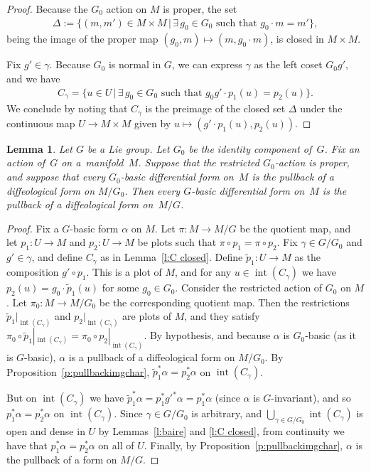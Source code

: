 \documentclass[pdftex]{sigma}
\numberwithin{equation}{section}
\newtheorem{Lemma}[Theorem]{Lemma}
\newcommand{\inter}{{\operatorname{int}}} %
\newcommand{\hypref}[2]{{#2~\ref{#1}}}
\begin{document}
\begin{proof}
Because the $G_0$ action on $M$ is proper, the set
\begin{gather*}
\Delta := \{ (m,m') \in M \times M \, | \,
\exists\, g_0 \in G_0 \text{ such that } g_0 \cdot m = m' \},
\end{gather*}
being the image of the proper map $(g_0,m) \mapsto (m,g_0 \cdot m)$,
is closed in $M \times M$.

Fix $g' \in \gamma$. Because $G_0$ is normal in $G$,
we can express $\gamma$ as the left coset $G_0 g'$, and we have
\begin{gather*} C_\gamma = \{ u \in U \, | \, \exists\, g_0 \in G_0 \text{ such that }
g_0 g' \cdot p_1(u) = p_2(u) \} .\end{gather*}
We conclude by noting that $C_\gamma$ is the preimage of the closed set $\Delta$
under the continuous map $U \to M \times M$
given by $u \mapsto ( g' \cdot p_1(u) , p_2(u) )$.
\end{proof}

\begin{Lemma} \label{l:conntodisc}
Let $G$ be a Lie group. Let $G_0$ be the identity component of~$G$.
Fix an action of~$G$ on a~mani\-fold~$M$.
Suppose that the restricted $G_0$-action is proper,
and suppose that every $G_0$-basic differential form on~$M$
is the pullback of a diffeological form on $M/G_0$.
Then every $G$-basic differential form on~$M$
is the pullback of a diffeological form on~$M/G$.
\end{Lemma}

\begin{proof}
Fix a $G$-basic form $\alpha$ on $M$.
Let $\pi \colon M\to M/G$ be the quotient map,
and let $p_1 \colon U\to M$ and $p_2 \colon U\to M$ be plots
such that $\pi\circ p_1=\pi\circ p_2$.
Fix $\gamma\in G/G_0$ and
$g' \in \gamma$, and def\/ine $C_\gamma$
as in \hypref{l:C closed}{Lemma}. Def\/ine $\tilde{p}_1 \colon U \to M$
as the composition
$g' \circ p_1$. This is a plot of $M$,
and for any $u \in \inter(C_\gamma)$ we have
$p_2(u) = g_0 \cdot\tilde{p}_1(u)$ for some $g_0 \in G_0$.
Consider the restricted action of $G_0$ on $M$.
Let $\pi_0 \colon M \to M/G_0$ be the corresponding quotient map.
Then the restrictions $\tilde{p}_1|_{\inter(C_\gamma)}$
and $p_2|_{\inter(C_\gamma)}$ are plots of $M$,
and they satisfy
$\pi_0 \circ \tilde{p}_1|_{\inter(C_\gamma)}
 = \pi_0 \circ p_2|_{\inter(C_\gamma)}$.
By hypothesis, and because $\alpha$ is $G_0$-basic (as it is $G$-basic),
$\alpha$ is a pullback of a dif\/feological form on $M/G_0$.
By \hypref{p:pullbackimgchar}{Proposition},
$\tilde{p}_1^* \alpha = p_2^*\alpha$ on $\inter(C_\gamma)$.

But on $\inter(C_\gamma)$ we have
$\tilde{p}_1^* \alpha = p_1^* {g'}^* \alpha = p_1^* \alpha$
(since $\alpha$ is $G$-invariant),
and so $p_1^* \alpha = p_2^* \alpha$ on $\inter(C_\gamma)$.
Since $\gamma\in G/G_0$ is arbitrary,
and $\bigcup_{\gamma\in G/G_0}\inter(C_\gamma)$ is open and dense in $U$
by Lemmas~\ref{l:baire} and \ref{l:C closed},
%
%
from continuity we have that $p_1^*\alpha=p_2^*\alpha$ on all of $U$.
Finally, by \hypref{p:pullbackimgchar}{Proposition},
$\alpha$ is the pullback of a form on $M/G$.
\end{proof}
\end{document}
